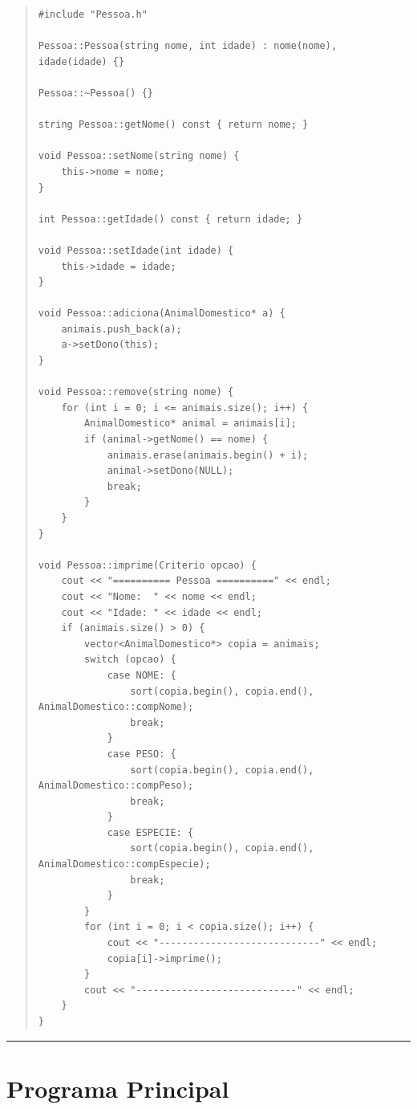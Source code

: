 \documentclass[12pt]{article}
\begin{document}
\begin{quote}
\begin{scriptsize}
\begin{verbatim}
#include "Pessoa.h"

Pessoa::Pessoa(string nome, int idade) : nome(nome), idade(idade) {}

Pessoa::~Pessoa() {}

string Pessoa::getNome() const { return nome; }

void Pessoa::setNome(string nome) {
    this->nome = nome;
}

int Pessoa::getIdade() const { return idade; }

void Pessoa::setIdade(int idade) {
    this->idade = idade;
}

void Pessoa::adiciona(AnimalDomestico* a) {
    animais.push_back(a);
    a->setDono(this);
}

void Pessoa::remove(string nome) {
    for (int i = 0; i <= animais.size(); i++) {
        AnimalDomestico* animal = animais[i];
        if (animal->getNome() == nome) {
            animais.erase(animais.begin() + i);
            animal->setDono(NULL);
            break;
        }
    }
}

void Pessoa::imprime(Criterio opcao) {
    cout << "========== Pessoa ==========" << endl;
    cout << "Nome:  " << nome << endl;
    cout << "Idade: " << idade << endl;
    if (animais.size() > 0) {
        vector<AnimalDomestico*> copia = animais;
        switch (opcao) {
            case NOME: {
                sort(copia.begin(), copia.end(), AnimalDomestico::compNome);
                break;
            }
            case PESO: {
                sort(copia.begin(), copia.end(), AnimalDomestico::compPeso);
                break;
            }
            case ESPECIE: {
                sort(copia.begin(), copia.end(), AnimalDomestico::compEspecie);
                break;
            }
        }
        for (int i = 0; i < copia.size(); i++) {
            cout << "----------------------------" << endl;
            copia[i]->imprime();
        }
        cout << "----------------------------" << endl;
    }
}
\end{verbatim}
\end{scriptsize}
\end{quote}

\par\noindent\rule{\textwidth}{0.4pt}

\section*{Programa Principal}
\end{document}
